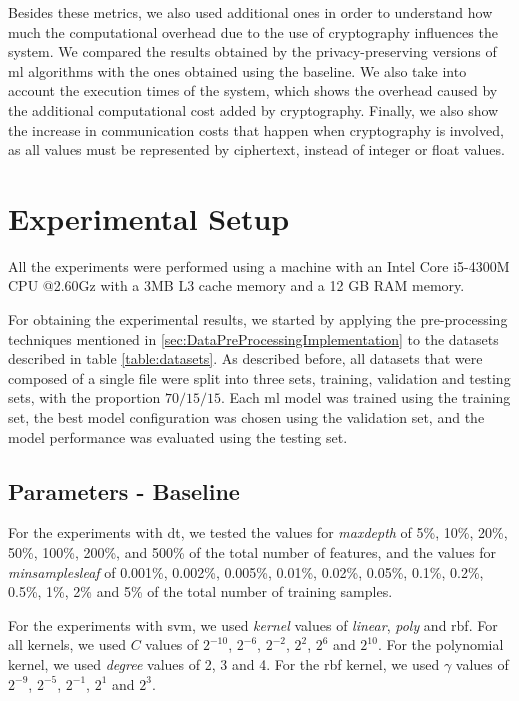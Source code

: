 Besides these metrics, we also used additional ones in order to understand how much the computational overhead due to the use of cryptography influences the system.
We compared the results obtained by the privacy-preserving versions of \ac{ml} algorithms with the ones obtained using the baseline. We also take into account the execution times of the system, which shows the overhead caused by the additional computational cost added by cryptography.
Finally, we also show the increase in communication costs that happen when cryptography is involved, as all values must be represented by ciphertext, instead of integer or float values.


\section{Experimental Setup}
\label{sec:ExperimentalSetup}

All the experiments were performed using a machine with an Intel Core i5-4300M CPU @2.60Gz with a 3MB L3 cache memory and a 12 GB RAM memory.

For obtaining the experimental results, we started by applying the pre-processing techniques mentioned in \ref{sec:DataPreProcessingImplementation} to the datasets described in table \ref{table:datasets}. As described before, all datasets that were composed of a single file were split into three sets, training, validation and testing sets, with the proportion $70/15/15$. Each \ac{ml} model was trained using the training set, the best model configuration was chosen using the validation set, and the model performance was evaluated using the testing set.

\subsection{Parameters - Baseline}

For the experiments with \ac{dt}, we tested the values for \textit{max\textunderscore depth} of 5\%, 10\%, 20\%, 50\%, 100\%, 200\%, and 500\% of the total number of features, and the values for \textit{min\textunderscore samples\textunderscore leaf} of 0.001\%, 0.002\%, 0.005\%, 0.01\%, 0.02\%, 0.05\%, 0.1\%, 0.2\%, 0.5\%, 1\%, 2\% and 5\% of the total number of training samples.

For the experiments with \ac{svm}, we used \textit{kernel} values of \textit{linear}, \textit{poly} and \ac{rbf}. For all kernels, we used $C$ values of $2^{-10}$, $2^{-6}$, $2^{-2}$, $2^{2}$, $2^{6}$ and $2^{10}$. For the polynomial kernel, we used \textit{degree} values of 2, 3 and 4. For the \ac{rbf} kernel, we used $\gamma$ values of $2^{-9}$, $2^{-5}$, $2^{-1}$, $2^{1}$ and $2^{3}$.

